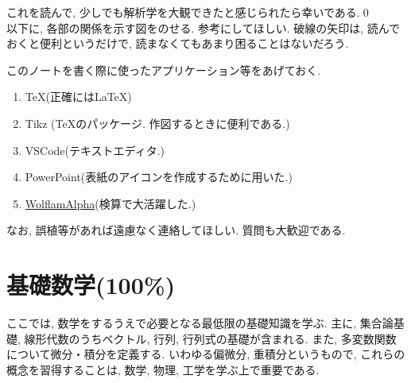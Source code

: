\documentclass[a4j,dvipdfmx]{jsarticle}
\numberwithin{equation}{section}
\begin{document}
        これを読んで, 少しでも解析学を大観できたと感じられたら幸いである.\qed\\

        以下に, 各部の関係を示す図をのせる. 参考にしてほしい. 破線の矢印は, 読んでおくと便利というだけで, 読まなくてもあまり困ることはないだろう.
        \begin{figure}[h]
            \centering
        \end{figure}

        このノートを書く際に使ったアプリケーション等をあげておく.
        \begin{enumerate}
            \item \TeX (正確には\LaTeX)
            \item Tikz (\TeX のパッケージ. 作図するときに便利である.)
            \item VSCode(テキストエディタ.)
            \item PowerPoint(表紙のアイコンを作成するために用いた.)
            \item \href{https://www.wolframalpha.com/}{WolflamAlpha}(検算で大活躍した.)
        \end{enumerate}

        なお, 誤植等があれば遠慮なく連絡してほしい. 質問も大歓迎である.
    \clearpage
    \label{目次}
    \tableofcontents
    \clearpage

    \part{基礎数学(100\%)}
    \begin{screen}
        ここでは, 数学をするうえで必要となる最低限の基礎知識を学ぶ. 主に, 集合論基礎, 線形代数のうちベクトル, 行列, 行列式の基礎が含まれる.
        また, 多変数関数について微分・積分を定義する. いわゆる偏微分, 重積分というもので, これらの概念を習得することは, 数学, 物理, 工学を学ぶ上で重要である.
    \end{screen}
    \clearpage
\end{document}
